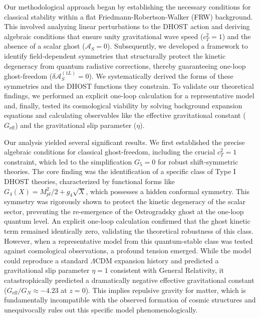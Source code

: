 \documentclass[twocolumn]{aastex631}
\begin{document}
Our methodological approach began by establishing the necessary conditions for classical stability within a flat Friedmann-Robertson-Walker (FRW) background. This involved analyzing linear perturbations to the DHOST action and deriving algebraic conditions that ensure unity gravitational wave speed ($c_T^2=1$) and the absence of a scalar ghost ($\mathcal{A}_S=0$). Subsequently, we developed a framework to identify field-dependent symmetries that structurally protect the kinetic degeneracy from quantum radiative corrections, thereby guaranteeing one-loop ghost-freedom ($\delta\mathcal{A}_S^{(1L)}=0$). We systematically derived the forms of these symmetries and the DHOST functions they constrain. To validate our theoretical findings, we performed an explicit one-loop calculation for a representative model and, finally, tested its cosmological viability by solving background expansion equations and calculating observables like the effective gravitational constant ($G_{\text{eff}}$) and the gravitational slip parameter ($\eta$).

Our analysis yielded several significant results. We first established the precise algebraic conditions for classical ghost-freedom, including the crucial $c_T^2=1$ constraint, which led to the simplification $G_5=0$ for robust shift-symmetric theories. The core finding was the identification of a specific class of Type I DHOST theories, characterized by functional forms like $G_4(X) = M_{pl}^2/2 + g_4 \sqrt{X}$, which possesses a hidden conformal symmetry. This symmetry was rigorously shown to protect the kinetic degeneracy of the scalar sector, preventing the re-emergence of the Ostrogradsky ghost at the one-loop quantum level. An explicit one-loop calculation confirmed that the ghost kinetic term remained identically zero, validating the theoretical robustness of this class. However, when a representative model from this quantum-stable class was tested against cosmological observations, a profound tension emerged. While the model could reproduce a standard $\Lambda$CDM expansion history and predicted a gravitational slip parameter $\eta=1$ consistent with General Relativity, it catastrophically predicted a dramatically negative effective gravitational constant ($G_{\text{eff}}/G_N \approx -4.23$ at $z=0$). This implies repulsive gravity for matter, which is fundamentally incompatible with the observed formation of cosmic structures and unequivocally rules out this specific model phenomenologically.
\end{document}
